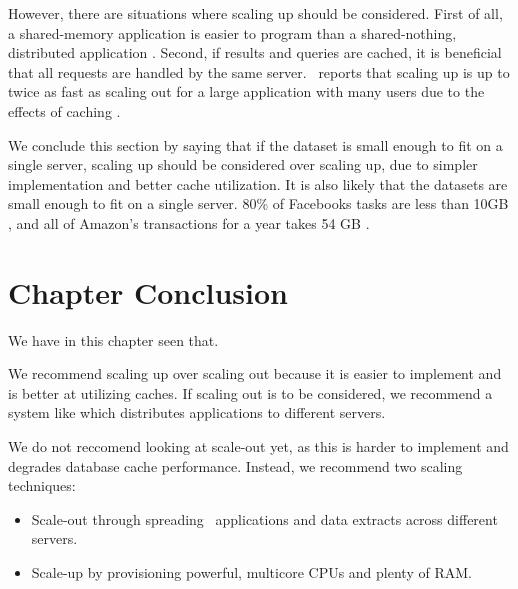 However, there are situations where scaling up should be considered. First of all, a shared-memory application is easier to program than a shared-nothing, distributed application \cite{Boncz2002-yj}. Second, if results and queries are cached, it is beneficial that all requests are handled by the same server. \qlikview~reports that scaling up is up to twice as fast as scaling out for a large application with many users due to the effects of caching \cite{Qlik2012-ku}.

We conclude this section by saying that if the dataset is small enough to fit on a single server, scaling up should be considered over scaling up, due to simpler implementation and better cache utilization. It is also likely that the datasets are small enough to fit on a single server. 80\% of Facebooks tasks are less than 10GB \cite{Mukherjee2015-ul}, and all of Amazon's transactions for a year takes 54 GB \cite{Kemper2011-ap}.

\section{Chapter Conclusion}
\label{sec:Chapter Conclusion}
We have in this chapter seen that.

We recommend scaling up over scaling out because it is easier to implement and is better at utilizing caches. If scaling out is to be considered, we recommend a system like \qlikview which distributes applications to different servers.


We do not reccomend looking at scale-out yet, as this is harder to implement and degrades database cache performance. Instead, we recommend two scaling techniques:
\begin{itemize}
  \item Scale-out through spreading \bd~applications and data extracts across different servers.
  \item Scale-up by provisioning powerful, multicore CPUs and plenty of RAM.
\end{itemize}

